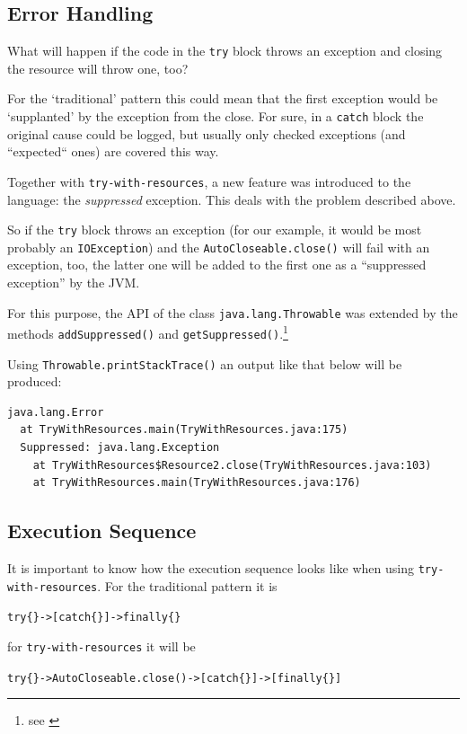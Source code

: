 \documentclass[12pt,a4paper,titlepage, parskip=half, headsepline, footsepline, cleardoubleplain]{scrbook}
\begin{document}
\subsection{Error Handling}
What will happen if the code in the \lstinline|try| block throws an exception and closing the resource will throw one, too?

For the ‘traditional’ pattern this could mean that the first exception would be ‘supplanted’ by the exception from the close. For sure, in a \lstinline|catch| block the original cause could be logged, but usually only checked exceptions (and “expected“ ones) are covered this way.

Together with \lstinline|try-with-resources|, a new feature was introduced to the language: the \textit{suppressed} exception. This deals with the problem described above.

So if the \lstinline|try| block throws an exception (for our example, it would be most probably an \lstinline|IOException|) and the \lstinline|AutoCloseable.close()| will fail with an exception, too, the latter one will be added to the first one as a “suppressed exception” by the JVM.

For this purpose, the API of the class \lstinline|java.lang.Throwable| was extended by the methods \lstinline|addSuppressed()| and \lstinline|getSuppressed()|.\footnote{see \autocite{ORACLE_DOC_THROWABLE_CLASS}}

Using \lstinline|Throwable.printStackTrace()| an output like that below will be produced:
\begin{lstlisting}
java.lang.Error
  at TryWithResources.main(TryWithResources.java:175)
  Suppressed: java.lang.Exception
    at TryWithResources$Resource2.close(TryWithResources.java:103)
    at TryWithResources.main(TryWithResources.java:176)
\end{lstlisting}

\subsection{Execution Sequence}\label{sec:ExecutionSequence}
It is important to know how the execution sequence looks like when using \lstinline|try-with-resources|. For the traditional pattern it is\\
\begin{center}
\verb#try{}->[catch{}]->finally{}#
\end{center} 
for \lstinline|try-with-resources| it will be\\ 
\begin{center}
\verb#try{}->AutoCloseable.close()->[catch{}]->[finally{}]#
\end{center}
\end{document}
